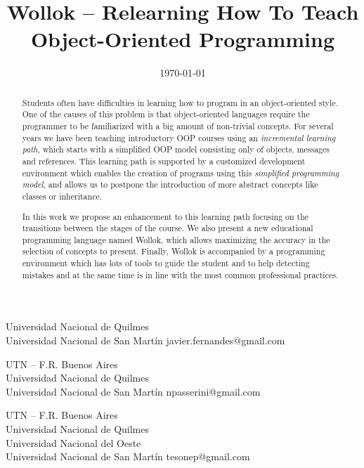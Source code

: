 \documentclass[preprint,10pt,nocopyrightspace]{sigplanconf}
\begin{document}
\title{Wollok -- Relearning How To Teach Object-Oriented Programming}
  {Universidad Nacional de Quilmes \\ Universidad Nacional de San Martín}
  {javier.fernandes@gmail.com}
  
  {UTN -- F.R. Buenos Aires \\ Universidad Nacional de Quilmes \\ Universidad Nacional de San Martín}
  {npasserini@gmail.com}
  
  {UTN -- F.R. Buenos Aires \\ Universidad Nacional de Quilmes \\ Universidad Nacional del Oeste \\ Universidad Nacional de San Martín}
  {tesonep@gmail.com}

\date{\today}
\maketitle

\begin{abstract}
Students often have difficulties in learning how to program in an object-oriented style. 
One of the causes of this problem is that object-oriented languages require the programmer to be familiarized with a big amount of non-trivial concepts. 
For several years we have been teaching introductory OOP courses using an \emph{incremental learning path}, 
which starts with a simplified OOP model consisting only of objects, messages and references. 
This learning path is supported by a customized development environment which enables the creation of programs using this \emph{simplified programming model}, 
and allows us to postpone the introduction of more abstract concepts like classes or inheritance. 

In this work we propose an enhancement to this learning path focusing on the transitions between the stages of the course. 
We also present a new educational programming language named Wollok, which allows maximizing the accuracy in the selection of concepts to present. 
Finally, Wollok is accompanied by a programming environment which has lots of tools to guide the student and to help detecting mistakes
and at the same time is in line with the most common professional practices.
\end{abstract}





\end{document}
